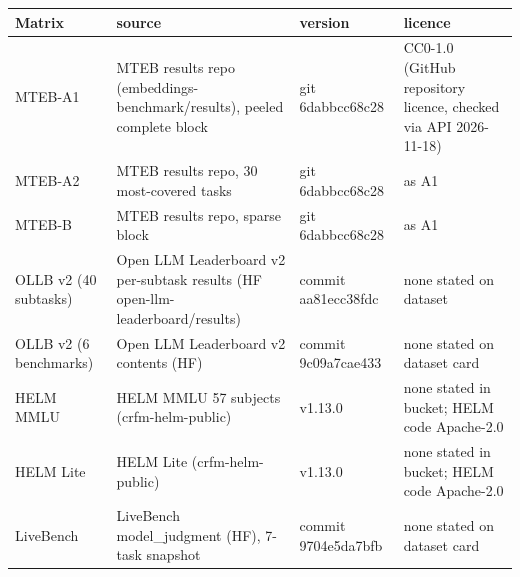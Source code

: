 \begin{tabular}{@{}lp{}p{}p{}@{}}
\toprule
Matrix & source & version & licence \\
\midrule
MTEB-A1 & MTEB results repo (embeddings-benchmark/results), peeled complete block & git 6dabbcc68c28 & CC0-1.0 (GitHub repository licence, checked via API 2026-11-18) \\
MTEB-A2 & MTEB results repo, 30 most-covered tasks & git 6dabbcc68c28 & as A1 \\
MTEB-B & MTEB results repo, sparse block & git 6dabbcc68c28 & as A1 \\
OLLB v2 (40 subtasks) & Open LLM Leaderboard v2 per-subtask results (HF open-llm-leaderboard/results) & commit aa81ecc38fdc & none stated on dataset \\
OLLB v2 (6 benchmarks) & Open LLM Leaderboard v2 contents (HF) & commit 9c09a7cae433 & none stated on dataset card \\
HELM MMLU & HELM MMLU 57 subjects (crfm-helm-public) & v1.13.0 & none stated in bucket; HELM code Apache-2.0 \\
HELM Lite & HELM Lite (crfm-helm-public) & v1.13.0 & none stated in bucket; HELM code Apache-2.0 \\
LiveBench & LiveBench model\_judgment (HF), 7-task snapshot & commit 9704e5da7bfb & none stated on dataset card \\
\bottomrule
\end{tabular}
